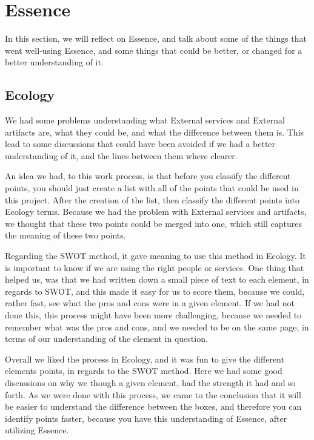 \section{Essence}\label{sec:eval_essence}
In this section, we will reflect on Essence, and talk about some of the things that went well-using Essence, and some things that could be better, or changed for a better understanding of it.

\subsection{Ecology}
We had some problems understanding what External services and External artifacts are, what they could be, and what the difference between them is.
This lead to some discussions that could have been avoided if we had a better understanding of it, and the lines between them where clearer.

An idea we had, to this work process, is that before you classify the different points, you should just create a list with all of the points that could be used in this project.
After the creation of the list, then classify the different points into Ecology terms.
Because we had the problem with External services and artifacts, we thought that these two points could be merged into one, which still captures the meaning of these two points.

Regarding the SWOT method, it gave meaning to use this method in Ecology. 
It is important to know if we are using the right people or services.
One thing that helped us, was that we had written down a small piece of text to each element, in regards to SWOT, and this made it easy for us to score them, because we could, rather fast, see what the pros and cons were in a given element.
If we had not done this, this process might have been more challenging, because we needed to remember what was the pros and cons, and we needed to be on the same page, in terms of our understanding of the element in question.

Overall we liked the process in Ecology, and it was fun to give the different elements points, in regards to the SWOT method. 
Here we had some good discussions on why we though a given element, had the strength it had and so forth.
As we were done with this process, we came to the conclusion that it will be easier to understand the difference between the boxes, and therefore you can identify points faster, because you have this understanding of Essence, after utilizing Essence.

